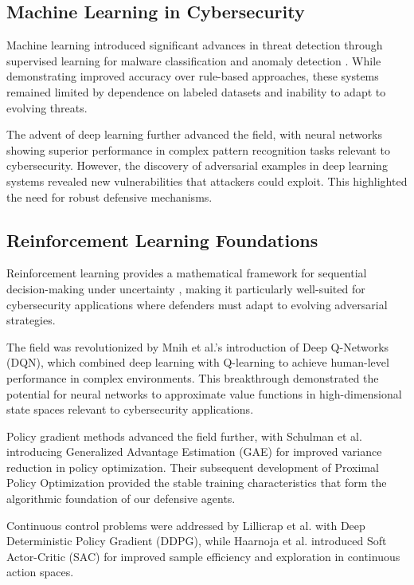 \documentclass[12pt,oneside]{article}
\begin{document}
\subsection{Machine Learning in Cybersecurity}

Machine learning introduced significant advances in threat detection through supervised learning for malware classification and anomaly detection \citep{sommer2010outside}. While demonstrating improved accuracy over rule-based approaches, these systems remained limited by dependence on labeled datasets and inability to adapt to evolving threats.

The advent of deep learning further advanced the field, with neural networks showing superior performance in complex pattern recognition tasks relevant to cybersecurity. However, the discovery of adversarial examples in deep learning systems \citep{goodfellow2014explaining} revealed new vulnerabilities that attackers could exploit. This highlighted the need for robust defensive mechanisms.

\subsection{Reinforcement Learning Foundations}

Reinforcement learning provides a mathematical framework for sequential decision-making under uncertainty \citep{sutton2018reinforcement}, making it particularly well-suited for cybersecurity applications where defenders must adapt to evolving adversarial strategies.

The field was revolutionized by Mnih et al.'s \cite{mnih2015human} introduction of Deep Q-Networks (DQN), which combined deep learning with Q-learning to achieve human-level performance in complex environments. This breakthrough demonstrated the potential for neural networks to approximate value functions in high-dimensional state spaces relevant to cybersecurity applications.

Policy gradient methods advanced the field further, with Schulman et al. \cite{schulman2015generalized} introducing Generalized Advantage Estimation (GAE) for improved variance reduction in policy optimization. Their subsequent development of Proximal Policy Optimization \cite{schulman2017proximal} provided the stable training characteristics that form the algorithmic foundation of our defensive agents.

Continuous control problems were addressed by Lillicrap et al. \cite{lillicrap2015continuous} with Deep Deterministic Policy Gradient (DDPG), while Haarnoja et al. \cite{haarnoja2018soft} introduced Soft Actor-Critic (SAC) for improved sample efficiency and exploration in continuous action spaces.
\end{document}
